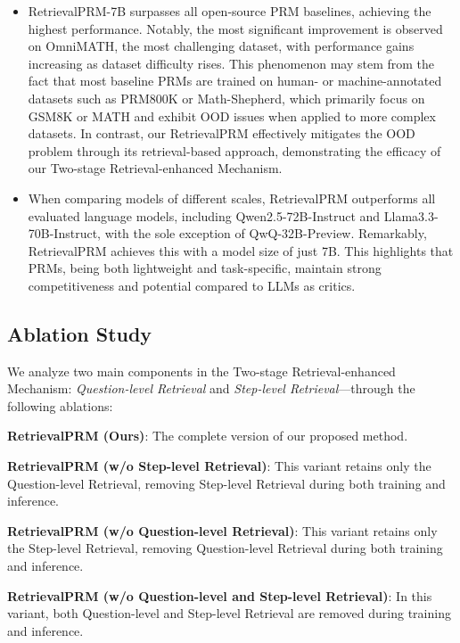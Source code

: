 \begin{itemize}[leftmargin=10pt]
    \item RetrievalPRM-7B surpasses all open-source PRM baselines, achieving the highest performance. Notably, the most significant improvement is observed on OmniMATH, the most challenging dataset, with performance gains increasing as dataset difficulty rises. This phenomenon may stem from the fact that most baseline PRMs are trained on human- or machine-annotated datasets such as PRM800K or Math-Shepherd, which primarily focus on GSM8K or MATH and exhibit OOD issues when applied to more complex datasets. In contrast, our RetrievalPRM effectively mitigates the OOD problem through its retrieval-based approach, demonstrating the efficacy of our Two-stage Retrieval-enhanced Mechanism.
    \item When comparing models of different scales, RetrievalPRM outperforms all evaluated language models, including Qwen2.5-72B-Instruct and Llama3.3-70B-Instruct, with the sole exception of QwQ-32B-Preview. Remarkably, RetrievalPRM achieves this with a model size of just 7B. This highlights that PRMs, being both lightweight and task-specific, maintain strong competitiveness and potential compared to LLMs as critics.
\end{itemize}
\subsection{Ablation Study}
We analyze two main components in the Two-stage Retrieval-enhanced Mechanism: \emph{Question-level Retrieval} and \emph{Step-level Retrieval}—through the following ablations:

\noindent\textbf{RetrievalPRM (Ours)}: The complete version of our proposed method.

\noindent\textbf{RetrievalPRM (w/o Step-level Retrieval)}: This variant retains only the Question-level Retrieval, removing Step-level Retrieval during both training and inference.

\noindent\textbf{RetrievalPRM (w/o Question-level Retrieval)}: This variant retains only the Step-level Retrieval, removing Question-level Retrieval during both training and inference.

\noindent\textbf{RetrievalPRM (w/o Question-level and Step-level Retrieval)}: In this variant, both Question-level and Step-level Retrieval are removed during training and inference.

